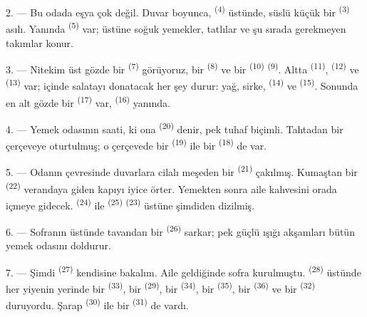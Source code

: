 2. --- Bu odada eşya çok değil. Duvar boyunca, 
\textsuperscript{(4)} üstünde, süslü küçük bir 
\textsuperscript{(3)} asılı. Yanında  \textsuperscript{(5)}
var; üstüne soğuk yemekler, tatlılar ve şu sırada gerekmeyen takımlar
konur.

3. --- Nitekim üst gözde bir  \textsuperscript{(7)}
görüyoruz, bir  \textsuperscript{(8)} ve bir 
\textsuperscript{(10)}  \textsuperscript{(9)}. Altta
 \textsuperscript{(11)},  \textsuperscript{(12)}
ve  \textsuperscript{(13)} var; içinde salatayı
donatacak her şey durur: yağ, sirke,  \textsuperscript{(14)} ve
 \textsuperscript{(15)}. Sonunda en alt gözde bir
 \textsuperscript{(17)} var, 
\textsuperscript{(16)} yanında.

4. --- Yemek odasının saati, ki ona  \textsuperscript{(20)}
denir, pek tuhaf biçimli. Tahtadan bir çerçeveye oturtulmuş; o çerçevede
bir  \textsuperscript{(19)} ile bir 
\textsuperscript{(18)} de var.

\VUsaut{4.6mm}
\VUsaut{3.0mm}

5. --- Odanın çevresinde duvarlara cilalı meşeden bir 
\textsuperscript{(21)} çakılmış. Kumaştan bir 
\textsuperscript{(22)} verandaya giden kapıyı iyice örter. Yemekten sonra aile
kahvesini orada içmeye gidecek.  \textsuperscript{(24)} ile
 \textsuperscript{(25)} 
\textsuperscript{(23)} üstüne şimdiden dizilmiş.

6. --- Sofranın üstünde tavandan bir  \textsuperscript{(26)}
sarkar; pek güçlü ışığı akşamları bütün yemek odasını doldurur.

7. --- Şimdi  \textsuperscript{(27)} kendisine
bakalım. Aile geldiğinde sofra kurulmuştu. 
\textsuperscript{(28)} üstünde her yiyenin yerinde bir 
\textsuperscript{(33)}, bir  \textsuperscript{(29)}, bir
 \textsuperscript{(34)}, bir 
\textsuperscript{(35)}, bir  \textsuperscript{(36)} ve bir
 \textsuperscript{(32)} duruyordu. Şarap 
\textsuperscript{(30)} ile bir  \textsuperscript{(31)} de
vardı.

